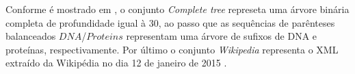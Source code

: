 \begin{table}[h!]
  \centering
  \caption[Conjunto de dados usados em testes experimetais]{Conjunto de dados usados nos testes experimetais }
  \label{tbl:dataset}
\end{table}

Conforme é mostrado em \citet{datasets-inf-udec}, o  conjunto \textit{Complete tree} represeta uma árvore binária completa de profundidade igual à 30, ao passo que as sequências  de parênteses balanceados $DNA$/$Proteins$ representam uma árvore de sufixos de DNA e proteínas, respectivamente. Por último o conjunto \textit{Wikipedia} representa o XML extraído da Wikipédia no dia 12 de janeiro de 2015 \citep{datasets-inf-udec}.

